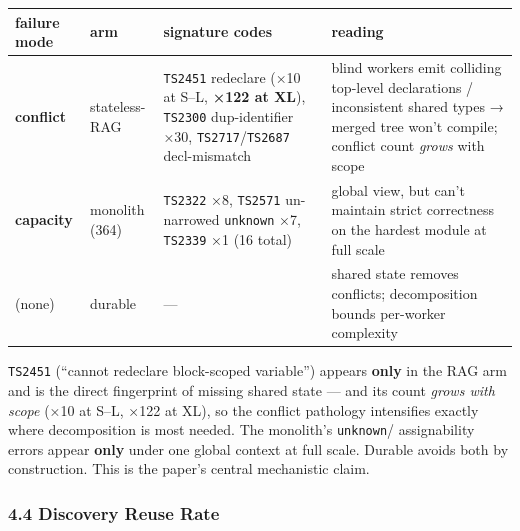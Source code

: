 \documentclass[
  10pt,
]{article}
\newcounter{none} %
\begin{document}
{\def\LTcaptype{none} %
\begin{longtable}[]{@{}
  >{\raggedright\arraybackslash}p{}
  >{\raggedright\arraybackslash}p{}
  >{\raggedright\arraybackslash}p{}
  >{\raggedright\arraybackslash}p{}@{}}
\toprule\noalign{}
\begin{minipage}[b]{\linewidth}\raggedright
failure mode
\end{minipage} & \begin{minipage}[b]{\linewidth}\raggedright
arm
\end{minipage} & \begin{minipage}[b]{\linewidth}\raggedright
signature codes
\end{minipage} & \begin{minipage}[b]{\linewidth}\raggedright
reading
\end{minipage} \\
\midrule\noalign{}
\endhead
\bottomrule\noalign{}
\endlastfoot
\textbf{conflict} & stateless-RAG & \texttt{TS2451} redeclare (×10 at
S--L, \textbf{×122 at XL}), \texttt{TS2300} dup-identifier ×30,
\texttt{TS2717}/\texttt{TS2687} decl-mismatch & blind workers emit
colliding top-level declarations / inconsistent shared types → merged
tree won't compile; conflict count \emph{grows} with scope \\
\textbf{capacity} & monolith (364) & \texttt{TS2322} ×8, \texttt{TS2571}
un-narrowed \texttt{unknown} ×7, \texttt{TS2339} ×1 (16 total) & global
view, but can't maintain strict correctness on the hardest module at
full scale \\
(none) & durable & --- & shared state removes conflicts; decomposition
bounds per-worker complexity \\
\end{longtable}
}

\texttt{TS2451} (``cannot redeclare block-scoped variable'') appears
\textbf{only} in the RAG arm and is the direct fingerprint of missing
shared state --- and its count \emph{grows with scope} (×10 at S--L,
×122 at XL), so the conflict pathology intensifies exactly where
decomposition is most needed. The monolith's \texttt{unknown}/
assignability errors appear \textbf{only} under one global context at
full scale. Durable avoids both by construction. This is the paper's
central mechanistic claim.

\subsubsection{4.4 Discovery Reuse Rate}\label{discovery-reuse-rate}
\end{document}
